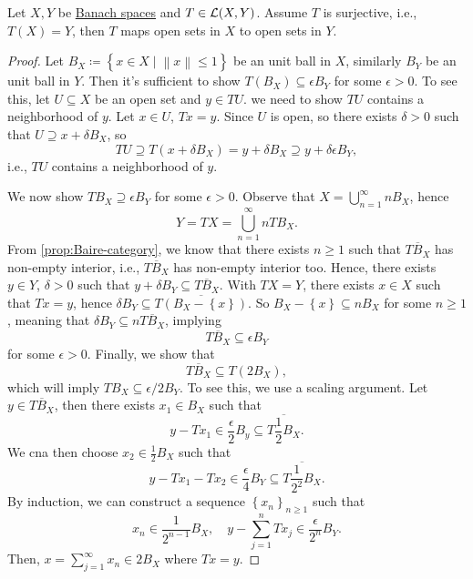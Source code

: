 \begin{theorem}\label{thm:open-mapping}
	Let \(X, Y\) be \hyperref[def:Banach-space]{Banach spaces} and \(T\in \mathcal{\MakeUppercase{l}} (X, Y)\). Assume \(T\) is surjective, i.e., \(T(X)= Y\), then \(T\) maps open sets in \(X\) to open sets in \(Y\).
\end{theorem}
\begin{proof}
	Let \(B_X \coloneqq \left\{ x\in X \mid \left\lVert x\right\rVert \leq 1 \right\} \) be an unit ball in \(X\), similarly \(B_Y\) be an unit ball in \(Y\). Then it's sufficient to show \(T(B_X) \subseteq \epsilon B_Y\) for some \(\epsilon > 0\). To see this, let \(U \subseteq X\) be an open set and \(y\in TU\). we need to show \(TU\) contains a neighborhood of \(y\). Let \(x\in U\), \(Tx = y\). Since \(U\) is open, so there exists \(\delta > 0\) such that \(U \supseteq x + \delta B_X\), so
	\[
		TU \supseteq T(x + \delta B_X) = y + \delta B_X \supseteq y + \delta \epsilon B_Y,
	\]
	i.e., \(TU\) contains a neighborhood of \(y\).

	We now show \(TB_X \supseteq \epsilon B_Y\) for some \(\epsilon > 0\). Observe that \(X = \bigcup_{n=1}^{\infty} n B_X\), hence
	\[
		Y = TX = \bigcup\limits_{n=1}^{\infty } n TB_{X}.
	\]
	From \autoref{prop:Baire-category}, we know that there exists \(n \geq 1\) such that \(\overline{TB_X}\) has non-empty interior, i.e., \(\overline{TB_X}\) has non-empty interior too. Hence, there exists \(y\in Y\), \(\delta > 0\) such that \(y + \delta B_Y \subseteq \overline{TB_X}\). With \(TX=Y\), there exists \(x\in X\) such that \(Tx = y\), hence \(\delta B_Y \subseteq \overline{T(B_X - \left\{ x \right\} )}\). So \(B_X - \left\{ x \right\} \subseteq n B_X\) for some \(n \geq 1\), meaning that \(\delta B_Y \subseteq n \overline{TB_X}\), implying
	\[
		\overline{TB_X}\subseteq \epsilon B_Y
	\]
	for some \(\epsilon > 0\). Finally, we show that
	\[
		\overline{TB_X} \subseteq T(2 B_X),
	\]
	which will imply \(TB_X \subseteq \epsilon / 2 B_Y\). To see this, we use a scaling argument. Let \(y\in \overline{TB_X}\), then there exists \(x_1 \in B_X\) such that
	\[
		y-Tx_1 \in \frac{\epsilon}{2} B_y \subseteq \overline{T \frac{1}{2}B_X}.
	\]
	We cna then choose \(x_2\in \frac{1}{2}B_X\) such that
	\[
		y-Tx_1 - Tx_2 \in \frac{\epsilon}{4}B_Y \subseteq \overline{T\frac{1}{2^2}B_X}.
	\]
	By induction, we can construct a sequence \(\left\{ x_n \right\}_{n\geq 1} \) such that
	\[
		x_n \in \frac{1}{2^{n-1}}B_X,\quad y- \sum_{j=1}^n Tx_j\in \frac{\epsilon}{2^n} B_Y.
	\]
	Then, \(x = \sum_{j=1} ^{\infty }x_n \in 2B_X\) where \(Tx = y\).
\end{proof}

